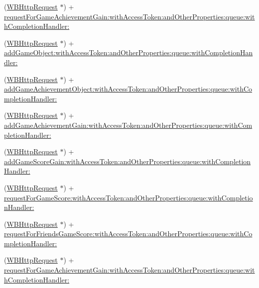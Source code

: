 \begin{DoxyCompactItemize}
\item 
(\mbox{\hyperlink{interface_w_b_http_request}{W\+B\+Http\+Request}} $\ast$) + \mbox{\hyperlink{category_w_b_http_request_07_weibo_game_08_aa17d2d459bebe0e5544e64eb307d2098}{request\+For\+Game\+Achievement\+Gain\+:with\+Access\+Token\+:and\+Other\+Properties\+:queue\+:with\+Completion\+Handler\+:}}
\item 
(\mbox{\hyperlink{interface_w_b_http_request}{W\+B\+Http\+Request}} $\ast$) + \mbox{\hyperlink{category_w_b_http_request_07_weibo_game_08_ae85dddcb52426ccf3105aecd613c25f1}{add\+Game\+Object\+:with\+Access\+Token\+:and\+Other\+Properties\+:queue\+:with\+Completion\+Handler\+:}}
\item 
(\mbox{\hyperlink{interface_w_b_http_request}{W\+B\+Http\+Request}} $\ast$) + \mbox{\hyperlink{category_w_b_http_request_07_weibo_game_08_a3e9ccee69346b4924f899ce4127e6c24}{add\+Game\+Achievement\+Object\+:with\+Access\+Token\+:and\+Other\+Properties\+:queue\+:with\+Completion\+Handler\+:}}
\item 
(\mbox{\hyperlink{interface_w_b_http_request}{W\+B\+Http\+Request}} $\ast$) + \mbox{\hyperlink{category_w_b_http_request_07_weibo_game_08_a49f7163ca8362f339d37df2b93e36d06}{add\+Game\+Achievement\+Gain\+:with\+Access\+Token\+:and\+Other\+Properties\+:queue\+:with\+Completion\+Handler\+:}}
\item 
(\mbox{\hyperlink{interface_w_b_http_request}{W\+B\+Http\+Request}} $\ast$) + \mbox{\hyperlink{category_w_b_http_request_07_weibo_game_08_a267d11cd3679a39fa49e42efaa9bf301}{add\+Game\+Score\+Gain\+:with\+Access\+Token\+:and\+Other\+Properties\+:queue\+:with\+Completion\+Handler\+:}}
\item 
(\mbox{\hyperlink{interface_w_b_http_request}{W\+B\+Http\+Request}} $\ast$) + \mbox{\hyperlink{category_w_b_http_request_07_weibo_game_08_aebf781874099f199819a90a1f83f06d5}{request\+For\+Game\+Score\+:with\+Access\+Token\+:and\+Other\+Properties\+:queue\+:with\+Completion\+Handler\+:}}
\item 
(\mbox{\hyperlink{interface_w_b_http_request}{W\+B\+Http\+Request}} $\ast$) + \mbox{\hyperlink{category_w_b_http_request_07_weibo_game_08_a07bfa63c702e8a920513d8b0accaf693}{request\+For\+Friends\+Game\+Score\+:with\+Access\+Token\+:and\+Other\+Properties\+:queue\+:with\+Completion\+Handler\+:}}
\item 
(\mbox{\hyperlink{interface_w_b_http_request}{W\+B\+Http\+Request}} $\ast$) + \mbox{\hyperlink{category_w_b_http_request_07_weibo_game_08_aa17d2d459bebe0e5544e64eb307d2098}{request\+For\+Game\+Achievement\+Gain\+:with\+Access\+Token\+:and\+Other\+Properties\+:queue\+:with\+Completion\+Handler\+:}}

\end{DoxyCompactItemize}
